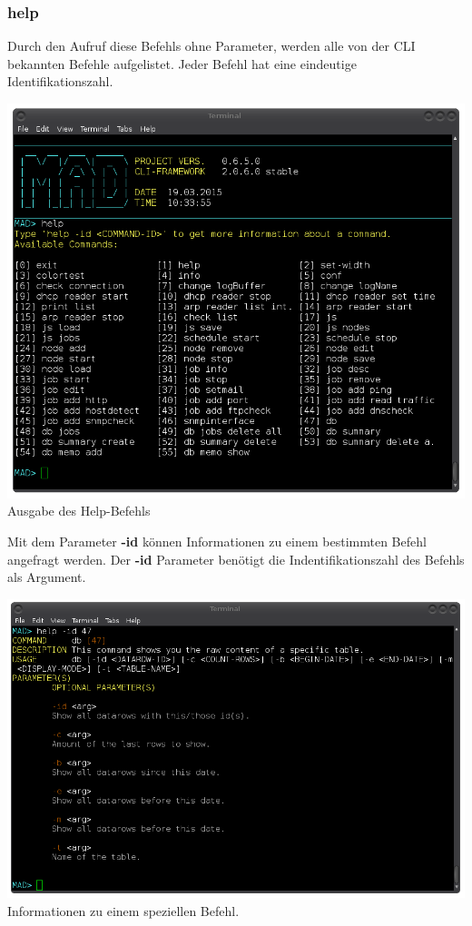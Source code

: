 \documentclass[12pt,a4paper]{report}
\begin{document}
\subsubsection{help}

Durch den Aufruf diese Befehls ohne Parameter, werden alle von der CLI bekannten Befehle aufgelistet. Jeder Befehl hat eine eindeutige Identifikationszahl.\\

\begin{center}
\includegraphics[scale=0.5]{img/cli_help.png}\\
Ausgabe des Help-Befehls
\end{center}

Mit dem Parameter \textbf{-id} können Informationen zu einem bestimmten Befehl angefragt werden. Der \textbf{-id} Parameter benötigt die Indentifikationszahl des Befehls als Argument.

\begin{center}
\includegraphics[scale=0.5]{img/cli_help_id.png}\\
Informationen zu einem speziellen Befehl.
\end{center}
\end{document}
